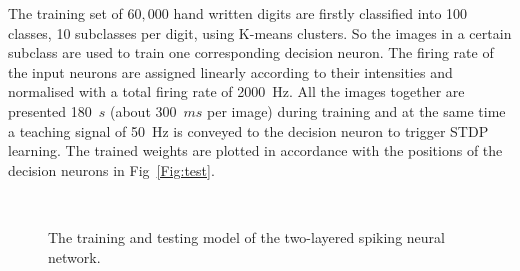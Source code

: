 The training set of $60,000$ hand written digits are firstly classified into 100 classes, 10 subclasses per digit, using K-means clusters.
So the images in a certain subclass are used to train one corresponding decision neuron.
The firing rate of the input neurons are assigned linearly according to their intensities and normalised with a total firing rate of 2000~Hz.
All the images together are presented 180~$s$ (about 300~$ms$ per image) during training and at the same time a teaching signal of 50~Hz is conveyed to the decision neuron to trigger STDP learning.
The trained weights are plotted in accordance with the positions of the decision neurons in Fig~\ref{Fig:test}.
\begin{figure}[thb!]
	\centering
	 \\

	\centering
	
		
	\caption{The training and testing model of the two-layered spiking neural network.}
	\label{fig:model}
\end{figure} 



